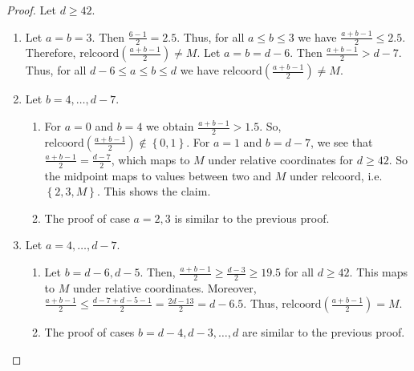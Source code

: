 \begin{proof}
    Let \( d \geq 42 \).
    \begin{enumerate}
        \item Let \( a = b = 3 \). Then \( \frac{6 - 1 }{2} = 2.5 \). Thus, for all \( a \leq b \leq 3 \) we have \( \frac{a + b - 1 }{2} \leq 2.5 \). Therefore, \(\mathrm{relcoord}( \frac{a + b - 1 }{2})  \neq M \). Let \( a = b = d - 6 \). Then \( \frac{a + b -1}{2} > d - 7 \). Thus, for all \( d-6 \leq a \leq b \leq d \) we have \( \mathrm{relcoord}(\frac{a + b - 1 }{2}) \neq M \).
        \item Let \( b = 4, \dots, d-7 \).
        \begin{enumerate}
            \item For \( a = 0 \) and \( b  = 4 \) we obtain \( \frac{a + b -1}{2} > 1.5 \). So, \( \mathrm{relcoord}(\frac{a + b - 1}{2})  \notin \left\{ 0,1 \right\} \). For \( a = 1 \) and \( b  = d-7 \), we see that \( \frac{a + b -1}{2} = \frac{d-7}{2} \), which maps to \( M \) under relative coordinates for \( d \geq 42 \). So the midpoint maps to values between two and \( M \) under \( \mathrm{relcoord} \), i.e. \( \left\{ 2,3,M \right\} \). This shows the claim.
            \item The proof of case \( a = 2,3 \) is similar to the previous proof.
        \end{enumerate}
        \item Let \( a = 4, \dots, d-7 \).
        \begin{enumerate}
            \item Let \( b = d-6, d-5 \). Then, \( \frac{a + b - 1}{2} \geq \frac{d - 3}{2} \geq 19.5 \) for all \( d \geq 42 \). This maps to \( M \) under relative coordinates. Moreover,  \( \frac{a + b - 1}{2} \leq \frac{d - 7 + d - 5 - 1}{2} = \frac{2d - 13}{2} = d - 6.5 \). Thus, 
            \( \mathrm{relcoord}(\frac{a + b - 1}{2}) = M \).
            \item The proof of cases \( b = d-4, d-3, \dots, d \) are similar to the previous proof.
        \end{enumerate}
    \end{enumerate}
\end{proof}



